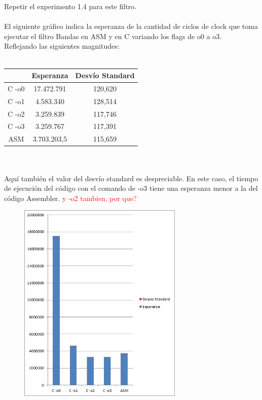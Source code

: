 Repetir el experimento 1.4 para este filtro. \\
\\
El siguiente gr\'afico indica la esperanza de la cantidad de ciclos de clock que toma ejecutar el filtro Bandas en ASM y en C variando los flags de o0 a o3. \\
Reflejando las siguientes magnitudes: \\
\\
 \begin{tabular}[c]{|c|c|c|}
	\hline
		 & Esperanza & Desv\'io Standard\\
		\hline
C -o0 & 17.472.791 & 120,620 \\
\hline
C -o1 & 4.583.340 & 128,514 \\
\hline
C -o2 & 3.259.839 & 117,746 \\
\hline
C -o3 & 3.259.767 & 117,391  \\
\hline
ASM & 3.703.203,5 & 115,659 \\
\hline
	\end{tabular}\\\\
Aqu\'i tambi\'en el valor del desv\'io standard es despreciable. En este caso, el tiempo de ejecuci\'on del c\'odigo con el comando de -o3 tiene una esperanza menor a la del c\'odigo Assembler. \textcolor{red}{y -o2 tambien, por que?}
\newpage
\begin{figure}
  \begin{center}
	\includegraphics[width=0.7\textwidth]{imagenes/32.jpg}
  \end{center}
\end{figure}
\newpage

